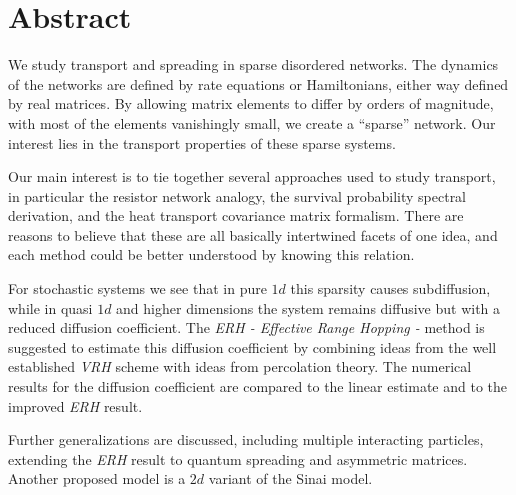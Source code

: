\chapter*{Abstract}


We study transport and spreading in sparse disordered networks. 
The dynamics of the networks are defined by rate equations or Hamiltonians,
either way defined by real matrices. 
By allowing matrix elements to differ by orders of magnitude,
with most of the elements vanishingly small, we create a ``sparse'' network.
Our interest lies in the transport properties of these sparse systems. 



Our main interest is to tie together several approaches 
used to study transport, in particular the resistor network 
analogy, the survival probability spectral derivation, and the
heat transport covariance matrix formalism. There are reasons to believe
that these are all basically intertwined facets of one idea, and each
method could be better understood by knowing this relation.


For stochastic systems we see 
that in pure $1d$ this sparsity causes subdiffusion, while in quasi $1d$ and
higher dimensions the system remains diffusive but with a reduced diffusion coefficient. 
The \emph{ERH - Effective Range Hopping -} method is suggested to estimate this diffusion 
coefficient by combining ideas from the well established \emph{VRH} scheme with 
ideas from percolation theory. The numerical results for the diffusion coefficient are compared to the linear
estimate and to the improved \emph{ERH} result.





Further generalizations are discussed, including multiple interacting particles,
extending the \emph{ERH} result to quantum spreading and
asymmetric matrices. Another proposed model is a $2d$ variant of 
the Sinai model.
